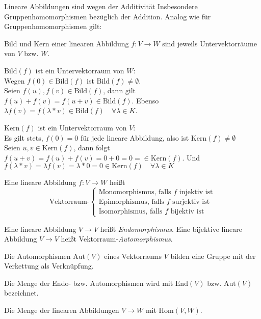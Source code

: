 Lineare Abbildungen sind wegen der Additivität Insbesondere Gruppenhomomorphismen bezüglich der Addition. Analog wie für Gruppenhomomorphismen gilt:

\begin{satz}{}
  Bild und Kern einer linearen Abbildung $f:V\rightarrow W$ sind jeweils Untervektorräume von $V$ bzw. $W$.
\end{satz}

\beweis
$\mathrm{Bild}(f)$ ist ein Untervektorraum von $W$:\\
Wegen $f(0)\in\mathrm{Bild}(f)$ ist $\mathrm{Bild}(f)\neq\emptyset$.\\
Seien $f(u),f(v)\in\mathrm{Bild}(f)$, dann gilt $f(u)+f(v)=f(u+v)\in\mathrm{Bild}(f)$.
Ebenso $\lambda f(v)=f(\lambda*v)\in\mathrm{Bild}(f) \quad \forall\lambda\in K$.

\bigskip

$\mathrm{Kern}(f)$ ist ein Untervektorraum von $V$:\\
Es gilt stets, $f(0)=0$ für jede lineare Abbildung, also ist $\mathrm{Kern}(f)\neq \emptyset$\\
Seien $u,v\in \mathrm{Kern}(f)$, dann folgt $f(u+v)=f(u)+f(v)=0+0=0=\in\mathrm{Kern}(f)$.
Und $f(\lambda *v)=\lambda f(v)=\lambda*0=0\in\mathrm{Kern}(f) \quad\forall \lambda\in K$


\begin{definition}{}
  Eine lineare Abbildung $f: V\rightarrow W$ heißt
  \begin{equation*}
    \text{Vektorraum-}
    \begin{cases}
      \text{Monomorphismus, falls $f$ injektiv ist}\\
      \text{Epimorphismus, falls $f$ surjektiv ist}\\
      \text{Isomorphismus, falls $f$ bijektiv ist}
    \end{cases}
  \end{equation*}

  Eine lineare Abbildung $V\rightarrow V$ heißt \emph{Endomorphismus}.
  Eine bijektive lineare Abbildung $V\rightarrow V$ heißt Vektorraum-\emph{Automorphismus}.


  \bemerkung{}
  Die Automorphismen $\mathrm{Aut}(V)$ eines Vektorraums $V$ bilden eine Gruppe mit der Verkettung als Verknüpfung.

  Die Menge der Endo- bzw. Automorphismen wird mit $\mathrm{End}(V)$ bzw. $\mathrm{Aut}(V)$ bezeichnet.

  Die Menge der linearen Abbildungen $V\rightarrow W$ mit $\mathrm{Hom}(V,W)$.
\end{definition}


